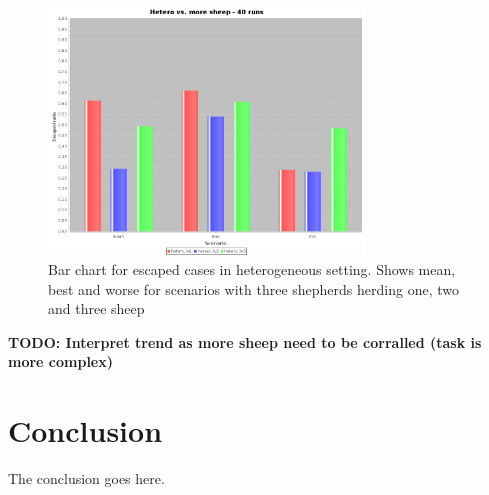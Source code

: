 \documentclass[conference]{IEEEtran}
\begin{document}
\begin{figure}[ht]
	\centering
	\includegraphics[width=3.3in]{imgs/hetero_3v1-hetero_3v2-hetero_3v3-escapedRatio-bar.jpeg}
	\caption{Bar chart for escaped cases in heterogeneous setting. Shows mean, best and worse for scenarios with three shepherds herding one, two and three sheep}
	\label{fig:escaped_threeShepherd}
\end{figure}

\textbf{TODO: Interpret trend as more sheep need to be corralled (task is more complex)}


\section{Conclusion}
The conclusion goes here.






\end{document}
